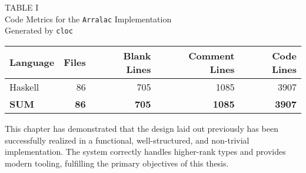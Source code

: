 \begin{table}[h!]
  \centering
  \begin{center}
    \textsc{TABLE I} \\ %
    \vspace{0.1cm} %
    Code Metrics for the \texttt{Arralac} Implementation \\
    Generated by \texttt{cloc}
  \end{center}
  \begin{tabular}{lrrrr}
    \toprule
    \textbf{Language} & \textbf{Files} & \textbf{Blank Lines} & \textbf{Comment Lines} & \textbf{Code Lines} \\
    \midrule
    Haskell           & 86             & 705                  & 1085                   & 3907                \\
    \midrule
    \textbf{SUM}      & \textbf{86}    & \textbf{705}         & \textbf{1085}          & \textbf{3907}       \\
    \bottomrule
  \end{tabular}
\label{table:cloc}
\end{table}

This chapter has demonstrated that the design laid out previously has been successfully realized in a functional, well-structured, and non-trivial implementation. The system correctly handles higher-rank types and provides modern tooling, fulfilling the primary objectives of this thesis.